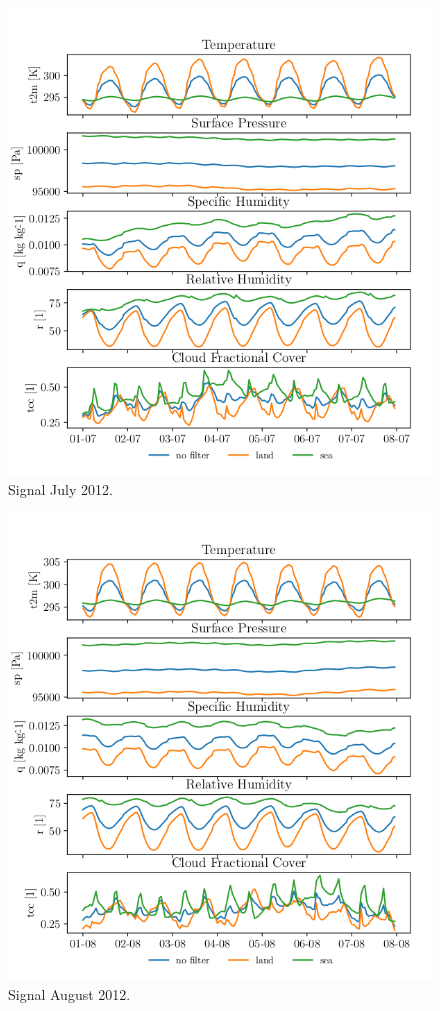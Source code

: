 \begin{figure}[ht]
    \centering
    \includegraphics{python_figs/spatially_averaged_one_week_from_2012-07-01.png}
    \caption{Signal July 2012.}
    \label{fig:jul12}
\end{figure}


\begin{figure}[ht]
    \centering
    \includegraphics{python_figs/spatially_averaged_one_week_from_2012-08-01.png}
    \caption{Signal August 2012.}
    \label{fig:aug12}
\end{figure}

